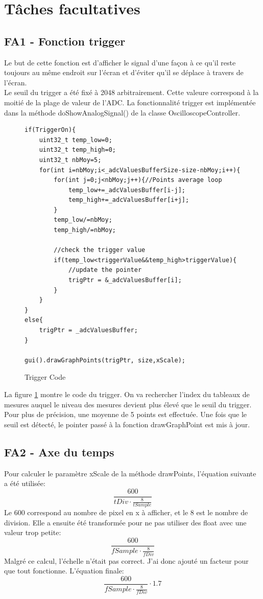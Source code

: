 \documentclass[12pt]{article}
\begin{document}
	\section{Tâches facultatives}
	\subsection{FA1 - Fonction trigger}
	Le but de cette fonction est d'afficher le signal d'une façon à ce qu'il reste toujours au même endroit sur l'écran et d’éviter qu’il se déplace à travers de l'écran.\\
	Le seuil du trigger a été fixé à 2048 arbitrairement. Cette valeure correspond à la moitié de la plage de valeur de l'ADC. La fonctionnalité trigger est implémentée dans la méthode doShowAnalogSignal() de la classe OscilloscopeController.\\
	
		\begin{figure}[H]
		\begin{lstlisting}
if(TriggerOn){
	uint32_t temp_low=0;
	uint32_t temp_high=0;
	uint32_t nbMoy=5;
	for(int i=nbMoy;i<_adcValuesBufferSize-size-nbMoy;i++){
		for(int j=0;j<nbMoy;j++){//Points average loop
			temp_low+=_adcValuesBuffer[i-j];
			temp_high+=_adcValuesBuffer[i+j];
		}
		temp_low/=nbMoy;
		temp_high/=nbMoy;
	
		//check the trigger value
		if(temp_low<triggerValue&&temp_high>triggerValue){
			//update the pointer
			trigPtr = &_adcValuesBuffer[i];
		}
	}
}
else{
	trigPtr = _adcValuesBuffer;
}

gui().drawGraphPoints(trigPtr, size,xScale);
		\end{lstlisting}
		\caption{Trigger Code}
		\label{code_trig}
	\end{figure}
La figure \ref{code_trig} montre le code du trigger. On va rechercher l'index du tableaux de mesures auquel le niveau des mesures devient plus élevé que le seuil du trigger. Pour plus de précision, une moyenne de 5 points est effectuée. Une fois que le seuil est détecté, le pointer passé à la fonction drawGraphPoint est mis à jour.	
	\subsection{FA2 - Axe du temps}
	Pour calculer le paramètre xScale de la méthode drawPoints, l'équation suivante a été utilisée:
	\begin{equation}
	\frac{600}{tDiv\cdot\frac{8}{tSample}}
	\end{equation}
	Le 600 correspond au nombre de pixel en x à afficher, et le 8 est le nombre de division.
	Elle a ensuite été transformée pour ne pas utiliser des float avec une valeur trop petite:
	\begin{equation}
		\frac{600}{fSample\cdot\frac{8}{fDiv}}
	\end{equation}
	Malgré ce calcul, l'échelle n'était pas correct. J'ai donc ajouté un facteur pour que tout fonctionne. L'équation finale:
	\begin{equation}
	\frac{600}{fSample\cdot\frac{8}{fDiv}}\cdot 1.7
	\end{equation}
\end{document}
